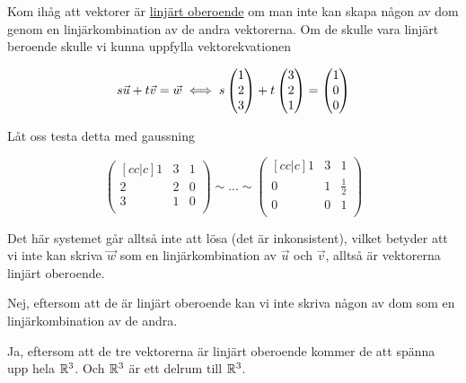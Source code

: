\documentclass[../../main.tex]{subfiles}
\begin{document}
\begin{solution}{1}


Kom ihåg att vektorer är \underline{linjärt oberoende} om man inte kan skapa någon av dom genom en linjärkombination av de andra vektorerna. Om de skulle vara linjärt beroende skulle vi kunna uppfylla vektorekvationen

$$s\Vec{u} + t\Vec{v} = \Vec{w} \iff s\begin{pmatrix}1\\2\\3\\\end{pmatrix} + t\begin{pmatrix}3\\2\\1\end{pmatrix} = \begin{pmatrix}1\\0\\0\end{pmatrix}$$

Låt oss testa detta med gaussning

$$
\begin{pmatrix}[cc|c]
1 & 3 & 1\\
2 & 2 & 0\\
3 & 1 & 0\\
\end{pmatrix}
\sim ... \sim 
\begin{pmatrix}[cc|c]
1 & 3 &           1 \\
0 & 1 & \frac{1}{2} \\
0 & 0 &           1 \\
\end{pmatrix}
$$

Det här systemet går alltså inte att lösa (det är inkonsistent), vilket betyder att vi inte kan skriva $\Vec{w}$ som en linjärkombination av $\Vec{u}$ och $\Vec{v}$, alltså är vektorerna linjärt oberoende.

Nej, eftersom att de är linjärt oberoende kan vi inte skriva någon av dom som en linjärkombination av de andra.

Ja, eftersom att de tre vektorerna är linjärt oberoende kommer de att spänna upp hela $\mathbb{R}^{3}$. Och $\mathbb{R}^{3}$ är ett delrum till $\mathbb{R}^{3}$.

\end{solution}
\end{document}
